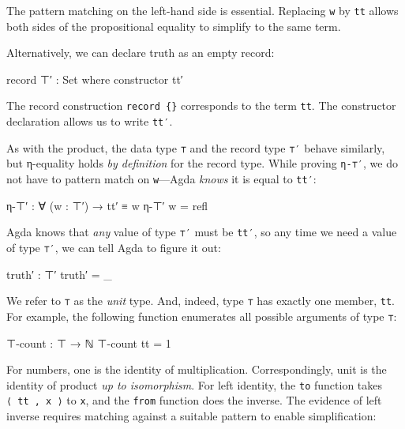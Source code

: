 The pattern matching on the left-hand side is essential. Replacing
\texttt{w} by \texttt{tt} allows both sides of the propositional
equality to simplify to the same term.

Alternatively, we can declare truth as an empty record:

\begin{fence}
\begin{code}
record ⊤′ : Set where
  constructor tt′
\end{code}
\end{fence}

The record construction \texttt{record\ \{\}} corresponds to the term
\texttt{tt}. The constructor declaration allows us to write
\texttt{tt′}.

As with the product, the data type \texttt{⊤} and the record type
\texttt{⊤′} behave similarly, but η-equality holds \emph{by definition}
for the record type. While proving \texttt{η-⊤′}, we do not have to
pattern match on \texttt{w}---Agda \emph{knows} it is equal to
\texttt{tt′}:

\begin{fence}
\begin{code}
η-⊤′ : ∀ (w : ⊤′) → tt′ ≡ w
η-⊤′ w = refl
\end{code}
\end{fence}

Agda knows that \emph{any} value of type \texttt{⊤′} must be
\texttt{tt′}, so any time we need a value of type \texttt{⊤′}, we can
tell Agda to figure it out:

\begin{fence}
\begin{code}
truth′ : ⊤′
truth′ = _
\end{code}
\end{fence}

We refer to \texttt{⊤} as the \emph{unit} type. And, indeed, type
\texttt{⊤} has exactly one member, \texttt{tt}. For example, the
following function enumerates all possible arguments of type \texttt{⊤}:

\begin{fence}
\begin{code}
⊤-count : ⊤ → ℕ
⊤-count tt = 1
\end{code}
\end{fence}

For numbers, one is the identity of multiplication. Correspondingly,
unit is the identity of product \emph{up to isomorphism}. For left
identity, the \texttt{to} function takes \texttt{⟨\ tt\ ,\ x\ ⟩} to
\texttt{x}, and the \texttt{from} function does the inverse. The
evidence of left inverse requires matching against a suitable pattern to
enable simplification:

